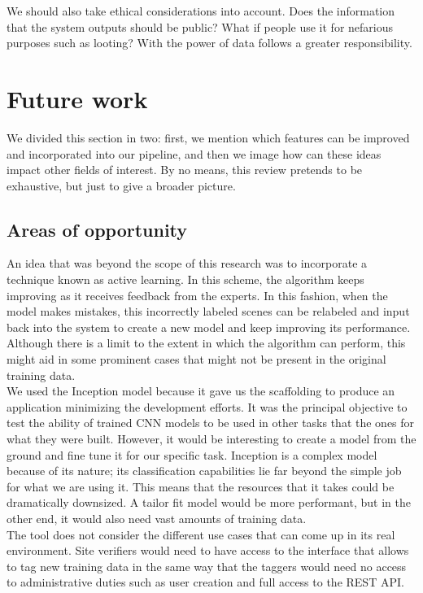 We should also take ethical considerations into account. Does the information that the system outputs should be public? What if people use it for nefarious purposes such as looting? With the power of data follows a greater responsibility.\\

\section{Future work}

We divided this section in two: first, we mention which features can be improved and incorporated into our pipeline, and then we image how can these ideas impact other fields of interest. By no means, this review pretends to be exhaustive, but just to give a broader picture.\\

\subsection{Areas of opportunity}

An idea that was beyond the scope of this research was to incorporate a technique known as active learning. In this scheme, the algorithm keeps improving as it receives feedback from the experts. In this fashion, when the model makes mistakes, this incorrectly labeled scenes can be relabeled and input back into the system to create a new model and keep improving its performance. Although there is a limit to the extent in which the algorithm can perform, this might aid in some prominent cases that might not be present in the original training data.\\

We used the Inception model because it gave us the scaffolding to produce an application minimizing the development efforts. It was the principal objective to test the ability of trained CNN models to be used in other tasks that the ones for what they were built. However, it would be interesting to create a model from the ground and fine tune it for our specific task. Inception is a complex model because of its nature; its classification capabilities lie far beyond the simple job for what we are using it. This means that the resources that it takes could be dramatically downsized. A tailor fit model would be more performant, but in the other end, it would also need vast amounts of training data.\\

The tool does not consider the different use cases that can come up in its real environment. Site verifiers would need to have access to the interface that allows to tag new training data in the same way that the taggers would need no access to administrative duties such as user creation and full access to the REST API.\\

